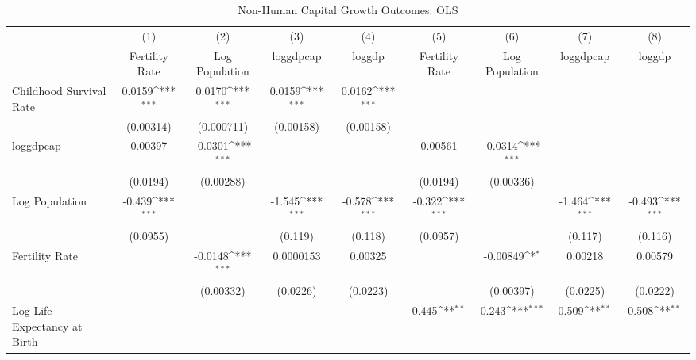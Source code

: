 \begin{table}[htbp]\centering
\def\sym#1{\ifmmode^{#1}\else\(^{#1}\)\fi}
\caption{Non-Human Capital Growth Outcomes: OLS}
\begin{tabular}{l*{8}{c}}
\toprule
                &\multicolumn{1}{c}{(1)}&\multicolumn{1}{c}{(2)}&\multicolumn{1}{c}{(3)}&\multicolumn{1}{c}{(4)}&\multicolumn{1}{c}{(5)}&\multicolumn{1}{c}{(6)}&\multicolumn{1}{c}{(7)}&\multicolumn{1}{c}{(8)}\\
                &\multicolumn{1}{c}{Fertility Rate}&\multicolumn{1}{c}{Log Population}&\multicolumn{1}{c}{loggdpcap}&\multicolumn{1}{c}{loggdp}&\multicolumn{1}{c}{Fertility Rate}&\multicolumn{1}{c}{Log Population}&\multicolumn{1}{c}{loggdpcap}&\multicolumn{1}{c}{loggdp}\\
\midrule
Childhood Survival Rate&   0.0159\sym{***}&   0.0170\sym{***}&   0.0159\sym{***}&   0.0162\sym{***}&                  &                  &                  &                  \\
                &(0.00314)         &(0.000711)         &(0.00158)         &(0.00158)         &                  &                  &                  &                  \\
\addlinespace
loggdpcap       &  0.00397         &  -0.0301\sym{***}&                  &                  &  0.00561         &  -0.0314\sym{***}&                  &                  \\
                & (0.0194)         &(0.00288)         &                  &                  & (0.0194)         &(0.00336)         &                  &                  \\
\addlinespace
Log Population  &   -0.439\sym{***}&                  &   -1.545\sym{***}&   -0.578\sym{***}&   -0.322\sym{***}&                  &   -1.464\sym{***}&   -0.493\sym{***}\\
                & (0.0955)         &                  &  (0.119)         &  (0.118)         & (0.0957)         &                  &  (0.117)         &  (0.116)         \\
\addlinespace
Fertility Rate  &                  &  -0.0148\sym{***}&0.0000153         &  0.00325         &                  & -0.00849\sym{*}  &  0.00218         &  0.00579         \\
                &                  &(0.00332)         & (0.0226)         & (0.0223)         &                  &(0.00397)         & (0.0225)         & (0.0222)         \\
\addlinespace
Log Life Expectancy at Birth&                  &                  &                  &                  &    0.445\sym{**} &    0.243\sym{***}&    0.509\sym{**} &    0.508\sym{**} \\

\end{tabular}
\end{table}
